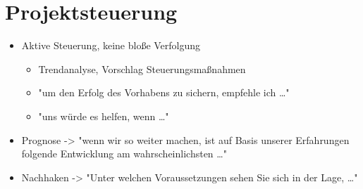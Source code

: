 \documentclass[a4paper]{article}
\begin{document}
\section{Projektsteuerung}
\begin{itemize}
  \item Aktive Steuerung, keine bloße Verfolgung
  \begin{itemize}
    \item Trendanalyse, Vorschlag Steuerungsmaßnahmen
    \item "um den Erfolg des Vorhabens zu sichern, empfehle ich \ldots"
    \item "uns würde es helfen, wenn \ldots"
  \end{itemize}
  \item Prognose -> "wenn wir so weiter machen, ist auf Basis unserer Erfahrungen folgende Entwicklung am wahrscheinlichsten \ldots"
  \item Nachhaken -> "Unter welchen Voraussetzungen sehen Sie sich in der Lage, \ldots"
\end{itemize}
\end{document}
